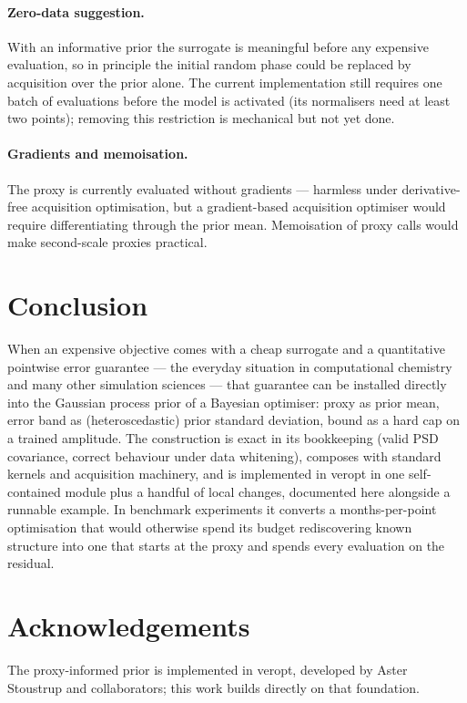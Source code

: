 \documentclass[11pt,a4paper]{article}
\newcommand{\veropt}{\textsf{veropt}}
\begin{document}
\paragraph{Zero-data suggestion.} With an informative prior the surrogate is
meaningful before any expensive evaluation, so in principle the initial random
phase could be replaced by acquisition over the prior alone. The current
implementation still requires one batch of evaluations before the model is
activated (its normalisers need at least two points); removing this
restriction is mechanical but not yet done.

\paragraph{Gradients and memoisation.} The proxy is currently evaluated
without gradients --- harmless under derivative-free acquisition optimisation,
but a gradient-based acquisition optimiser would require differentiating
through the prior mean. Memoisation of proxy calls would make second-scale
proxies practical.

\section{Conclusion}

When an expensive objective comes with a cheap surrogate and a quantitative
pointwise error guarantee --- the everyday situation in computational
chemistry and many other simulation sciences --- that guarantee can be
installed directly into the Gaussian process prior of a Bayesian optimiser:
proxy as prior mean, error band as (heteroscedastic) prior standard deviation,
bound as a hard cap on a trained amplitude. The construction is exact in its
bookkeeping (valid PSD covariance, correct behaviour under data whitening),
composes with standard kernels and acquisition machinery, and is implemented
in \veropt{} in one self-contained module plus a handful of local changes,
documented here alongside a runnable example. In benchmark experiments it
converts a months-per-point optimisation that would otherwise spend its
budget rediscovering known structure into one that starts at the proxy and
spends every evaluation on the residual.

\section*{Acknowledgements}

The proxy-informed prior is implemented in \veropt{}, developed by Aster
Stoustrup and collaborators; this work builds directly on that foundation.
\end{document}
